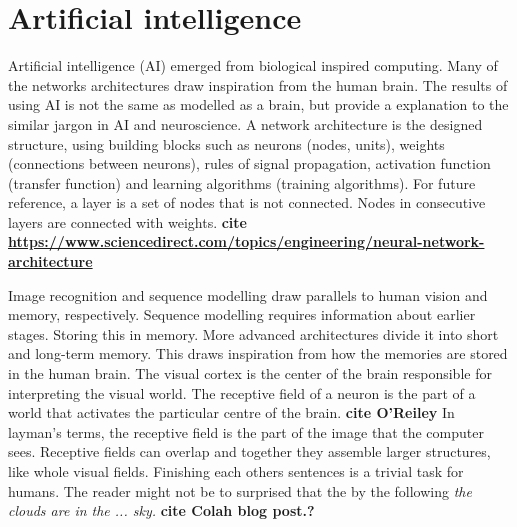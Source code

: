 \documentclass{article}
\begin{document}
\section{Artificial intelligence}
Artificial intelligence (AI) emerged from biological inspired computing. Many of the networks architectures draw inspiration from the human brain. The results of using AI is not the same as modelled as a brain, but provide a explanation to the similar jargon in AI and neuroscience. A network architecture is the designed structure, using building blocks such as neurons (nodes, units), weights (connections between neurons), rules of signal propagation, activation function (transfer function) and learning algorithms (training algorithms). For future reference, a layer is a set of nodes that is not connected. Nodes in consecutive layers are connected with weights. \textbf{cite \href{https://www.sciencedirect.com/topics/engineering/neural-network-architecture}{\textbf{https://www.sciencedirect.com/topics/engineering/neural-network-architecture}}}

Image recognition and sequence modelling draw parallels to human vision and memory, respectively. Sequence modelling requires information about earlier stages. Storing this in memory. More advanced architectures divide it into short and long-term memory. This draws inspiration from how the memories are stored in the human brain. The visual cortex is the center of the brain responsible for interpreting the visual world. The receptive field of a neuron is the part of a world that activates the particular centre of the brain. \textbf{cite O'Reiley} In layman's terms, the receptive field is the part of the image that the computer sees. Receptive fields can overlap and together they assemble larger structures, like whole visual fields. Finishing each others sentences is a trivial task for humans. The reader might not be to surprised that the by the following \textit{the clouds are in the ... sky.} \textbf{cite Colah blog post.?}
\end{document}
